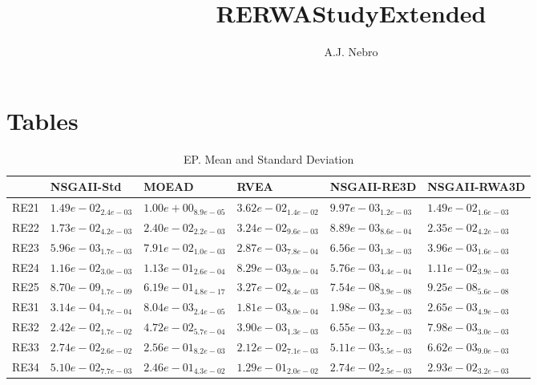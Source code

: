 \documentclass{article}
\title{RERWAStudyExtended}
\author{A.J. Nebro}
\begin{document}
\maketitle
\section{Tables}

\begin{table}
\caption{EP. Mean and Standard Deviation}
\label{table: EP}
\centering
\begin{scriptsize}
\begin{tabular}{llllll}
\hline & NSGAII-Std & MOEAD & RVEA & NSGAII-RE3D &  NSGAII-RWA3D\\
\hline 
RE21 & \cellcolor{gray25}$  1.49e-02_{ 2.4e-03}$ & $  1.00e+00_{ 8.9e-05}$ & $  3.62e-02_{ 1.4e-02}$ & \cellcolor{gray95}$  9.97e-03_{ 1.2e-03}$ & $  1.49e-02_{ 1.6e-03}$ \\
RE22 & \cellcolor{gray25}$  1.73e-02_{ 4.2e-03}$ & $  2.40e-02_{ 2.2e-03}$ & $  3.24e-02_{ 9.6e-03}$ & \cellcolor{gray95}$  8.89e-03_{ 8.6e-04}$ & $  2.35e-02_{ 4.2e-03}$ \\
RE23 & $  5.96e-03_{ 1.7e-03}$ & $  7.91e-02_{ 1.0e-03}$ & \cellcolor{gray95}$  2.87e-03_{ 7.8e-04}$ & $  6.56e-03_{ 1.3e-03}$ & \cellcolor{gray25}$  3.96e-03_{ 1.6e-03}$ \\
RE24 & $  1.16e-02_{ 3.0e-03}$ & $  1.13e-01_{ 2.6e-04}$ & \cellcolor{gray25}$  8.29e-03_{ 9.0e-04}$ & \cellcolor{gray95}$  5.76e-03_{ 4.4e-04}$ & $  1.11e-02_{ 3.9e-03}$ \\
RE25 & \cellcolor{gray95}$  8.70e-09_{ 1.7e-09}$ & $  6.19e-01_{ 4.8e-17}$ & $  3.27e-02_{ 8.4e-03}$ & \cellcolor{gray25}$  7.54e-08_{ 3.9e-08}$ & $  9.25e-08_{ 5.6e-08}$ \\
RE31 & \cellcolor{gray95}$  3.14e-04_{ 1.7e-04}$ & $  8.04e-03_{ 2.4e-05}$ & \cellcolor{gray25}$  1.81e-03_{ 8.0e-04}$ & $  1.98e-03_{ 2.3e-03}$ & $  2.65e-03_{ 4.9e-03}$ \\
RE32 & $  2.42e-02_{ 1.7e-02}$ & $  4.72e-02_{ 5.7e-04}$ & \cellcolor{gray95}$  3.90e-03_{ 1.3e-03}$ & \cellcolor{gray25}$  6.55e-03_{ 2.2e-03}$ & $  7.98e-03_{ 3.0e-03}$ \\
RE33 & $  2.74e-02_{ 2.6e-02}$ & $  2.56e-01_{ 8.2e-03}$ & $  2.12e-02_{ 7.1e-03}$ & \cellcolor{gray95}$  5.11e-03_{ 5.5e-03}$ & \cellcolor{gray25}$  6.62e-03_{ 9.0e-03}$ \\
RE34 & $  5.10e-02_{ 7.7e-03}$ & $  2.46e-01_{ 4.3e-02}$ & $  1.29e-01_{ 2.0e-02}$ & \cellcolor{gray95}$  2.74e-02_{ 2.5e-03}$ & \cellcolor{gray25}$  2.93e-02_{ 3.2e-03}$ \\

\end{tabular}
\end{scriptsize}
\end{table}
\end{document}
